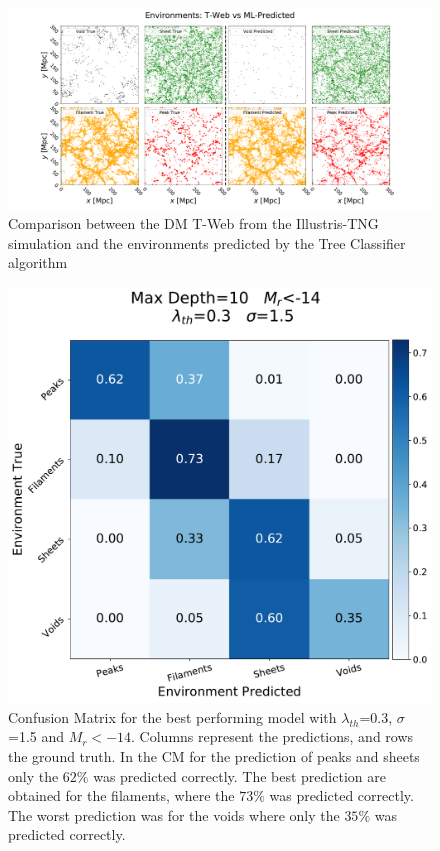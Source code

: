 \documentclass[usenatbib]{mnras}
\begin{document}
\begin{figure}
  \centering 
    \includegraphics[scale=0.33]{Figs/Fig2.pdf}
    \caption{Comparison between the DM T-Web from the Illustris-TNG simulation and the environments predicted by the Tree Classifier algorithm}
    \label{fig:prediction}
\end{figure}


\begin{figure}
\centering
    \includegraphics[scale=0.36]{Figs/p_CM_EnvPredTreeClass.pdf}
    \caption{Confusion Matrix for the best performing model with $\lambda_{th}$=0.3, $\sigma$=1.5 and $M_{r}<-14$. Columns represent the predictions, and rows the ground truth. In the CM for the prediction of peaks and sheets only the $62\%$ was predicted correctly. The best prediction are obtained for the filaments, where the $73\%$ was predicted correctly. The worst prediction was for the voids where only the $35\%$ was predicted correctly.}
    \label{fig:confusion_matrix}    
\end{figure}
\end{document}
